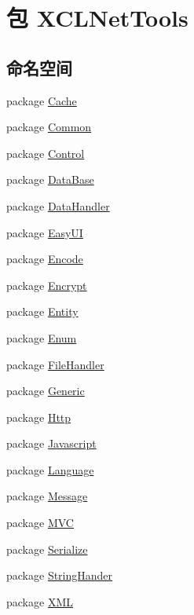 \hypertarget{namespace_x_c_l_net_tools}{\section{包 X\-C\-L\-Net\-Tools}
\label{namespace_x_c_l_net_tools}
}
\subsection*{命名空间}
\begin{DoxyCompactItemize}
\item 
package \hyperlink{namespace_x_c_l_net_tools_1_1_cache}{Cache}
\item 
package \hyperlink{namespace_x_c_l_net_tools_1_1_common}{Common}
\item 
package \hyperlink{namespace_x_c_l_net_tools_1_1_control}{Control}
\item 
package \hyperlink{namespace_x_c_l_net_tools_1_1_data_base}{Data\-Base}
\item 
package \hyperlink{namespace_x_c_l_net_tools_1_1_data_handler}{Data\-Handler}
\item 
package \hyperlink{namespace_x_c_l_net_tools_1_1_easy_u_i}{Easy\-U\-I}
\item 
package \hyperlink{namespace_x_c_l_net_tools_1_1_encode}{Encode}
\item 
package \hyperlink{namespace_x_c_l_net_tools_1_1_encrypt}{Encrypt}
\item 
package \hyperlink{namespace_x_c_l_net_tools_1_1_entity}{Entity}
\item 
package \hyperlink{namespace_x_c_l_net_tools_1_1_enum}{Enum}
\item 
package \hyperlink{namespace_x_c_l_net_tools_1_1_file_handler}{File\-Handler}
\item 
package \hyperlink{namespace_x_c_l_net_tools_1_1_generic}{Generic}
\item 
package \hyperlink{namespace_x_c_l_net_tools_1_1_http}{Http}
\item 
package \hyperlink{namespace_x_c_l_net_tools_1_1_javascript}{Javascript}
\item 
package \hyperlink{namespace_x_c_l_net_tools_1_1_language}{Language}
\item 
package \hyperlink{namespace_x_c_l_net_tools_1_1_message}{Message}
\item 
package \hyperlink{namespace_x_c_l_net_tools_1_1_m_v_c}{M\-V\-C}
\item 
package \hyperlink{namespace_x_c_l_net_tools_1_1_serialize}{Serialize}
\item 
package \hyperlink{namespace_x_c_l_net_tools_1_1_string_hander}{String\-Hander}
\item 
package \hyperlink{namespace_x_c_l_net_tools_1_1_x_m_l}{X\-M\-L}
\end{DoxyCompactItemize}
